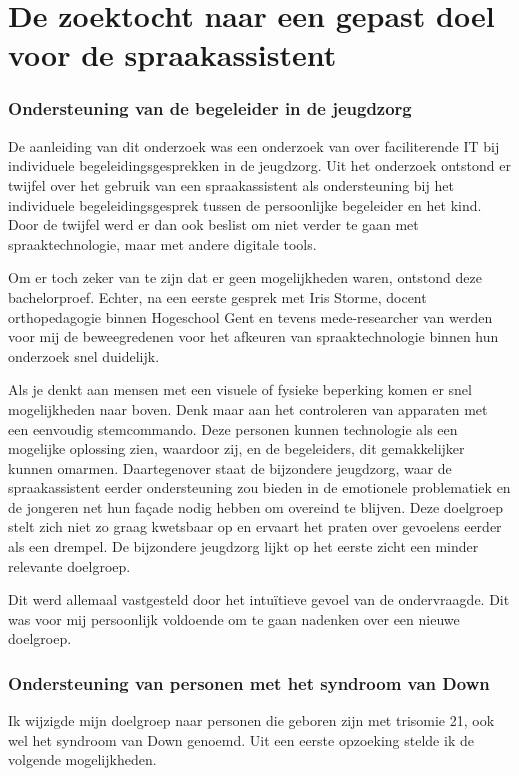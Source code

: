 \chapter{De zoektocht naar een gepast doel voor de spraakassistent}
\label{De zoektocht naar een gepaste doelgroep}

\subsection{Ondersteuning van de begeleider in de jeugdzorg}
\label{ondersteuning van de begeleider in de jeugdzorg}
De aanleiding van dit onderzoek was een onderzoek van \autocite{Buysse} over faciliterende IT bij individuele begeleidingsgesprekken in de jeugdzorg. Uit het onderzoek ontstond er twijfel over het gebruik van een spraakassistent als ondersteuning bij het individuele begeleidingsgesprek tussen de persoonlijke begeleider en het kind. Door de twijfel werd er dan ook beslist om niet verder te gaan met spraaktechnologie, maar met andere digitale tools.

Om er toch zeker van te zijn dat er geen mogelijkheden waren, ontstond deze bachelorproef. Echter, na een eerste gesprek met Iris Storme, docent orthopedagogie binnen Hogeschool Gent en tevens mede-researcher van \autocite{Buysse} werden voor mij de beweegredenen voor het afkeuren van spraaktechnologie binnen hun onderzoek snel duidelijk. 

Als je denkt aan mensen met een visuele of fysieke beperking komen er snel mogelijkheden naar boven. Denk maar aan het controleren van apparaten met een eenvoudig stemcommando. Deze personen kunnen technologie als een mogelijke oplossing zien, waardoor zij, en de begeleiders, dit gemakkelijker kunnen omarmen.
Daartegenover staat de bijzondere jeugdzorg, waar de spraakassistent eerder ondersteuning zou bieden in de emotionele problematiek en de jongeren net hun façade nodig hebben om overeind te blijven. Deze doelgroep stelt zich niet zo graag kwetsbaar op en ervaart het praten over gevoelens eerder als een drempel. De bijzondere jeugdzorg lijkt op het eerste zicht een minder relevante doelgroep.

Dit werd allemaal vastgesteld door het intuïtieve gevoel van de ondervraagde. Dit was voor mij persoonlijk voldoende om te gaan nadenken over een nieuwe doelgroep.

\subsection{Ondersteuning van personen met het syndroom van Down}
\label{ondersteuning van personen met het syndroom van Down}
Ik wijzigde mijn doelgroep naar personen die geboren zijn met trisomie 21, ook wel het syndroom van Down genoemd. Uit een eerste opzoeking stelde ik de volgende mogelijkheden.


